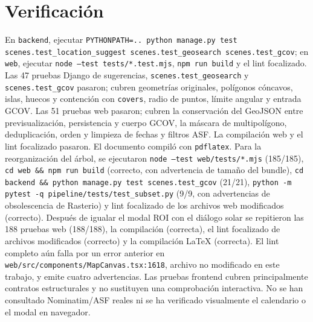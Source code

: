 \documentclass[11pt]{article}
\begin{document}
\section{Verificación}
En \texttt{backend}, ejecutar \texttt{PYTHONPATH=.. python manage.py test scenes.test\_location\_suggest scenes.test\_geosearch scenes.test\_gcov}; en \texttt{web}, ejecutar \texttt{node --test tests/*.test.mjs}, \texttt{npm run build} y el lint focalizado. Las 47 pruebas Django de sugerencias, \texttt{scenes.test\_geosearch} y \texttt{scenes.test\_gcov} pasaron; cubren geometrías originales, polígonos cóncavos, islas, huecos y contención con \texttt{covers}, radio de puntos, límite angular y entrada GCOV. Las 51 pruebas web pasaron; cubren la conservación del GeoJSON entre previsualización, persistencia y cuerpo GCOV, la máscara de multipolígono, deduplicación, orden y limpieza de fechas y filtros ASF. La compilación web y el lint focalizado pasaron. El documento compiló con \texttt{pdflatex}. Para la reorganización del árbol, se ejecutaron \texttt{node --test web/tests/*.mjs} (185/185), \texttt{cd web \&\& npm run build} (correcto, con advertencia de tamaño del bundle), \texttt{cd backend \&\& python manage.py test scenes.test\_gcov} (21/21), \texttt{python -m pytest -q pipeline/tests/test\_subset.py} (9/9, con advertencias de obsolescencia de Rasterio) y lint focalizado de los archivos web modificados (correcto). Después de igualar el modal ROI con el diálogo solar se repitieron las 188 pruebas web (188/188), la compilación (correcta), el lint focalizado de archivos modificados (correcto) y la compilación LaTeX (correcta). El lint completo aún falla por un error anterior en \texttt{web/src/components/MapCanvas.tsx:1618}, archivo no modificado en este trabajo, y emite cuatro advertencias. Las pruebas frontend cubren principalmente contratos estructurales y no sustituyen una comprobación interactiva. No se han consultado Nominatim/ASF reales ni se ha verificado visualmente el calendario o el modal en navegador.
\end{document}
